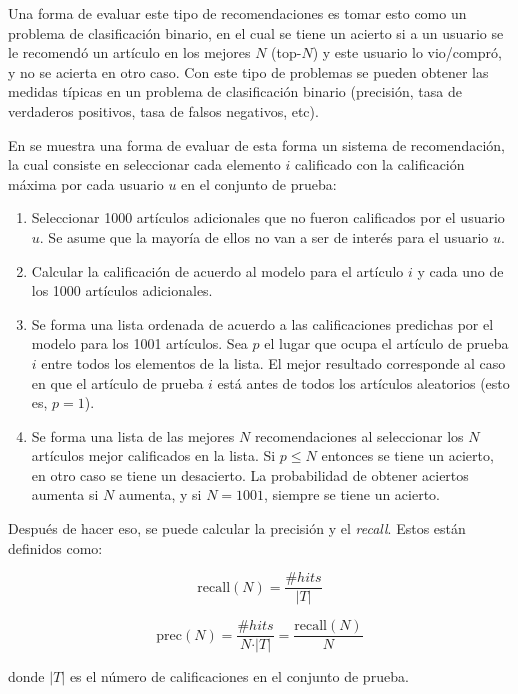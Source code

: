 Una forma de evaluar este tipo de recomendaciones es tomar esto como un problema de clasificación binario, en el cual se tiene un acierto si a un usuario se le recomendó un artículo en los mejores $N$ (top-$N$) y este usuario lo vio/compró, y no se acierta en otro caso. Con este tipo de problemas se pueden obtener las medidas típicas en un problema de clasificación binario (precisión, tasa de verdaderos positivos, tasa de falsos negativos, etc). 

En \cite{Cremonesi:2010:PRA:1864708.1864721} se muestra una forma de evaluar de esta forma un sistema de recomendación, la cual consiste en seleccionar cada elemento $i$ calificado con la calificación máxima por cada usuario $u$ en el conjunto de prueba:

\begin{enumerate}
  \item Seleccionar 1000 artículos adicionales que no fueron calificados por el usuario $u$. Se asume que la mayoría de ellos no van a ser de interés para el usuario $u$.
  \item Calcular la calificación de acuerdo al modelo para el artículo $i$ y cada uno de los 1000 artículos adicionales.
  \item Se forma una lista ordenada de acuerdo a las calificaciones predichas por el modelo para los 1001 artículos. Sea $p$ el lugar que ocupa el artículo de prueba $i$ entre todos los elementos de la lista. El mejor resultado corresponde al caso en que el artículo de prueba $i$ está antes de todos los artículos aleatorios (esto es, $p = 1$).
  \item Se forma una lista de las mejores $N$ recomendaciones al seleccionar los $N$ artículos mejor calificados en la lista. Si $p \leq N$ entonces se tiene un acierto, en otro caso se tiene un desacierto. La probabilidad de obtener aciertos aumenta si $N$ aumenta, y si $N = 1001$, siempre se tiene un acierto.
\end{enumerate}

Después de hacer eso, se puede calcular la precisión y el \textit{recall}. Estos están definidos como:

\[
  \text{recall}(N) = \frac{\# hits}{\vert T \vert}
\]

\[
  \text{prec}(N) = \frac{\# hits}{N \cdot \vert T \vert} = \frac{\text{recall}(N)}{N}
\]

donde $\vert T \vert$ es el número de calificaciones en el conjunto de prueba.






